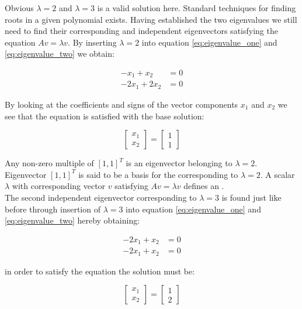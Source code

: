 Obvious $\lambda = 2$ and $\lambda = 3$ is a valid solution here.
Standard techniques for finding roots in a given
polynomial exists. Having established the two eigenvalues we still need to find their
corresponding and independent eigenvectors satisfying the equation $A
v = \lambda v$. By inserting $\lambda = 2$ into equation
\eqref{eq:eigenvalue_one} and \eqref{eq:eigenvalue_two} we obtain:

\begin{align}
-x_1 + x_2 & = 0 \\
-2x_1 + 2x_2 & = 0
\end{align}

By looking at the coefficients and signs of the vector components $x_1$
and $x_2$ we see that the equation is satisfied with the base solution:

\begin{equation}
\begin{bmatrix}
x_1 \\ x_2
\end{bmatrix}
=
\begin{bmatrix}
1 \\ 1
\end{bmatrix}
\end{equation}

Any non-zero multiple of $[1,1]^T$ is an eigenvector belonging to
$\lambda = 2$. Eigenvector $[1,1]^T$ is said to be a basis for the
 corresponding to $\lambda = 2$.
A scalar $\lambda$ with corresponding vector $v$ satisfying 
$A v = \lambda v$ defines an . \\ 

The second independent eigenvector corresponding to $\lambda = 3$ is
found just like before through insertion of $\lambda = 3$ into equation
\eqref{eq:eigenvalue_one} and \eqref{eq:eigenvalue_two} hereby obtaining:

\begin{align}
\label{eq:eigenvalue_one_reduced}
-2x_1 + x_2 & = 0 \\
\label{eq:eigenvalue_two_reduces}
-2x_1 + x_2 & = 0
\end{align}

in order to satisfy the equation the solution must be:

\begin{equation}
\begin{bmatrix}
x_1 \\ x_2
\end{bmatrix}
=
\begin{bmatrix}
1 \\ 2
\end{bmatrix}
\end{equation}

